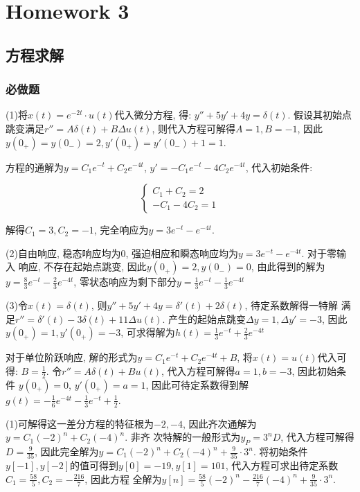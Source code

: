 \section{Homework 3}

\subsection{方程求解}

\subsubsection{必做题}


(1)将$x(t)=e^{-2t}\cdot u(t)$代入微分方程, 得: $y''+5y'+4y=\delta(t)$. 假设其初始点
跳变满足$r''=A\delta(t)+B\Delta u(t)$, 则代入方程可解得$A=1, B=-1$, 因此$y(0_+)=
y(0_-)=2, y'(0_+)=y'(0_-)+1=1$.

方程的通解为$y=C_1e^{-t}+C_2e^{-4t}$, $y'=-C_1e^{-t}-4C_2e^{-4t}$, 代入初始条件:

\begin{equation*}
    \left\{
        \begin{array}{l}
            C_1+C_2=2 \\
            -C_1-4C_2=1
        \end{array}
    \right.
\end{equation*}

解得$C_1=3, C_2=-1$, 完全响应为$y=3e^{-t}-e^{-4t}$.

(2)自由响应, 稳态响应均为$0$, 强迫相应和瞬态响应均为$y=3e^{-t}-e^{-4t}$. 对于零输入
响应, 不存在起始点跳变, 因此$y(0_+)=2,y(0_-)=0$, 由此得到的解为$y=\frac{8}{3}e^{-t}
-\frac{2}{3}e^{-4t}$, 零状态响应为剩下部分$y=\frac{1}{3}e^{-t}-\frac{1}{3}e^{-4t}$

(3)令$x(t)=\delta(t)$, 则$y''+5y'+4y=\delta'(t)+2\delta(t)$, 待定系数解得一特解
满足$r''=\delta'(t)-3\delta(t)+11\Delta u(t)$. 产生的起始点跳变$\Delta y=1,\Delta 
y'=-3$, 因此$y(0_+)=1, y'(0_+)=-3$, 可求得解为$h(t)=\frac{1}{3}e^{-t}+\frac{2}{3}
e^{-4t}$

对于单位阶跃响应, 解的形式为$y=C_1e^{-t}+C_2e^{-4t}+B$, 将$x(t)=u(t)$代入可得: $B=
\frac{1}{2}$. 令$r''=A\delta(t)+Bu(t)$, 代入方程可解得$a=1, b=-3$, 因此初始条件
$y(0_+)=0$, $y'(0_+)=a=1$, 因此可待定系数得到解$g(t)=-\frac{1}{6}e^{-4t}-\frac{1}
{3}e^{-t}+\frac{1}{2}$.

(1)可解得这一差分方程的特征根为$-2,-4$, 因此齐次通解为$y=C_1(-2)^n+C_2(-4)^n$. 非齐
次特解的一般形式为$y_P=3^nD$, 代入方程可解得$D=\frac{9}{35}$, 因此完全解为$y=C_1(-2)
^n+C_2(-4)^n+\frac{9}{35}\cdot3^n$. 将初始条件$y[-1],y[-2]$的值可得到$y[0]=-19, 
y[1]=101$, 代入方程可求出待定系数$C_1=\frac{58}{5}, C_2=-\frac{216}{7}$, 因此方程
全解为$y[n]=\frac{58}{5}(-2)^n-\frac{216}{7}(-4)^n+\frac{9}{35}\cdot3^n$.

